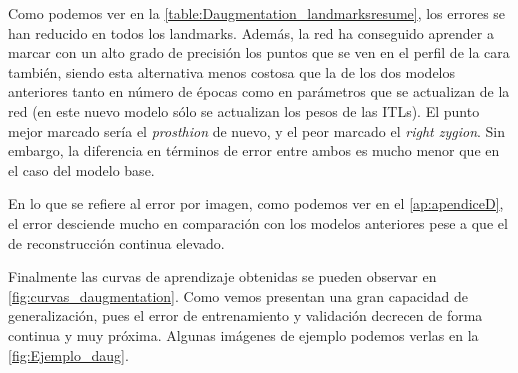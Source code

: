         \noindent Como podemos ver en la \autoref{table:Daugmentation_landmarksresume}, los errores se han reducido en todos los landmarks. Además, la red ha conseguido aprender a marcar con un alto grado de precisión los puntos que se ven en el perfil de la cara también, siendo esta alternativa menos costosa que la de los dos modelos anteriores tanto en número de épocas como en parámetros que se actualizan de la red (en este nuevo modelo sólo se actualizan los pesos de las ITLs). El punto mejor marcado sería el \textit{prosthion} de nuevo, y el peor marcado el \textit{right zygion}. Sin embargo, la diferencia en términos de error entre ambos es mucho menor que en el caso del modelo base. 

        \medskip

        \noindent En lo que se refiere al error por imagen, como podemos ver en el \autoref{ap:apendiceD}, el error desciende mucho en comparación con los modelos anteriores pese a que el de reconstrucción continua elevado.

        \medskip

        \noindent Finalmente las curvas de aprendizaje obtenidas se pueden observar en \autoref{fig:curvas_daugmentation}. Como vemos presentan una gran capacidad de generalización, pues el error de entrenamiento y validación decrecen de forma continua y muy próxima. Algunas imágenes de ejemplo podemos verlas en la \autoref{fig:Ejemplo_daug}.

